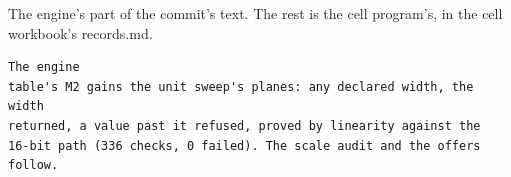 The engine's part of the commit's text. The rest is the cell program's, in the cell workbook's records.md.

\begin{Verbatim}
The engine
table's M2 gains the unit sweep's planes: any declared width, the width
returned, a value past it refused, proved by linearity against the
16-bit path (336 checks, 0 failed). The scale audit and the offers
follow.
\end{Verbatim}
